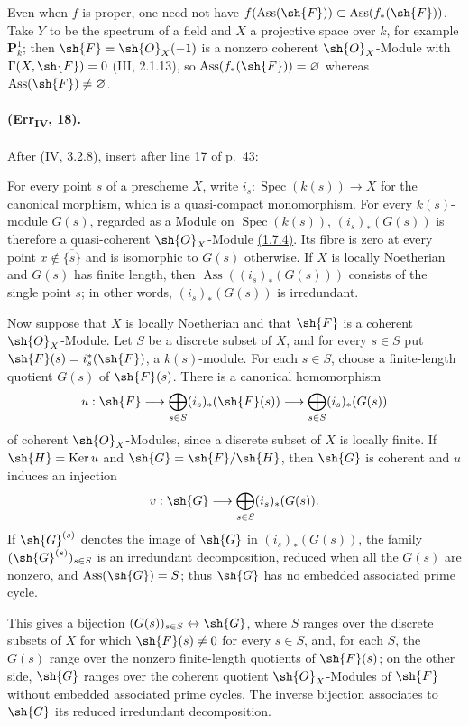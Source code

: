\begin{remark}[3.1.10.5]
\label{IV.3.1.10.5}
Even when $f$ is proper, one need not have
$f(\operatorname{Ass}(\sh{F}))\subset
\operatorname{Ass}(f_*(\sh{F}))$.  Take $Y$ to be the spectrum of a
field and $X$ a projective space over $k$, for example $\mathbf P^1_k$;
then $\sh{F}=\sh{O}_X(-1)$ is a nonzero coherent $\sh{O}_X$-Module with
$\Gamma(X,\sh{F})=0$ (III, 2.1.13), so
$\operatorname{Ass}(f_*(\sh{F}))=\varnothing$ whereas
$\operatorname{Ass}(\sh{F})\neq\varnothing$.
\end{remark}

\paragraph{(Err\textsubscript{IV}, 18).}
After (IV, 3.2.8), insert after line 17 of p.~43:

\begin{remark}[3.2.9]
\label{IV.3.2.9}
For every point $s$ of a prescheme $X$, write
$i_s:\operatorname{Spec}(k(s))\to X$ for the canonical morphism, which
is a quasi-compact monomorphism.  For every $k(s)$-module $G(s)$,
regarded as a Module on $\operatorname{Spec}(k(s))$,
$(i_s)_*(G(s))$ is therefore a quasi-coherent $\sh{O}_X$-Module
{\hyperlink{ega4.c04.statement.1-7-4}{(1.7.4)}}.  Its fibre is zero at every point
$x\notin\overline{\{s\}}$ and is isomorphic to $G(s)$ otherwise.  If
$X$ is locally Noetherian and $G(s)$ has finite length, then
$\operatorname{Ass}((i_s)_*(G(s)))$ consists of the single point $s$;
in other words, $(i_s)_*(G(s))$ is irredundant.

Now suppose that $X$ is locally Noetherian and that $\sh{F}$ is a
coherent $\sh{O}_X$-Module.  Let $S$ be a discrete subset of $X$, and
for every $s\in S$ put $\sh{F}(s)=i_s^*(\sh{F})$, a $k(s)$-module.
For each $s\in S$, choose a finite-length quotient $G(s)$ of
$\sh{F}(s)$.  There is a canonical homomorphism
\[
 u:\sh{F}\longrightarrow
 \bigoplus_{s\in S}(i_s)_*(\sh{F}(s))\longrightarrow
 \bigoplus_{s\in S}(i_s)_*(G(s))
\]
of coherent $\sh{O}_X$-Modules, since a discrete subset of $X$ is
locally finite.  If $\sh{H}=\operatorname{Ker}u$ and
$\sh{G}=\sh{F}/\sh{H}$, then $\sh{G}$ is coherent and $u$ induces an
injection
\[
 v:\sh{G}\longrightarrow\bigoplus_{s\in S}(i_s)_*(G(s)).
\]
If $\sh{G}^{(s)}$ denotes the image of $\sh{G}$ in
$(i_s)_*(G(s))$, the family $(\sh{G}^{(s)})_{s\in S}$ is an
irredundant decomposition, reduced when all the $G(s)$ are nonzero, and
$\operatorname{Ass}(\sh{G})=S$; thus $\sh{G}$ has no embedded
associated prime cycle.

This gives a bijection $(G(s))_{s\in S}\leftrightarrow\sh{G}$, where
$S$ ranges over the discrete subsets of $X$ for which
$\sh{F}(s)\neq0$ for every $s\in S$, and, for each $S$, the $G(s)$
range over the nonzero finite-length quotients of $\sh{F}(s)$; on the
other side, $\sh{G}$ ranges over the coherent quotient
$\sh{O}_X$-Modules of $\sh{F}$ without embedded associated prime
cycles.  The inverse bijection associates to $\sh{G}$ its reduced
irredundant decomposition.
\end{remark}

